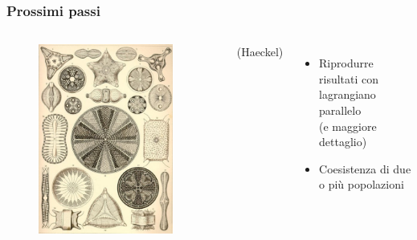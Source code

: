 \begin{frame}
  \frametitle{Prossimi passi}
  \begin{columns}
    \begin{figure}[!htb]
      \centering
      \includegraphics[width=0.9\textwidth]{../img/haeckel-diatoms}
    \end{figure}
    (Haeckel)
    \begin{itemize}
      \item Riprodurre risultati con lagrangiano parallelo
        \\
        (e maggiore dettaglio)
      \item Coesistenza di due o più popolazioni
    \end{itemize}
  \end{columns}

\end{frame}
